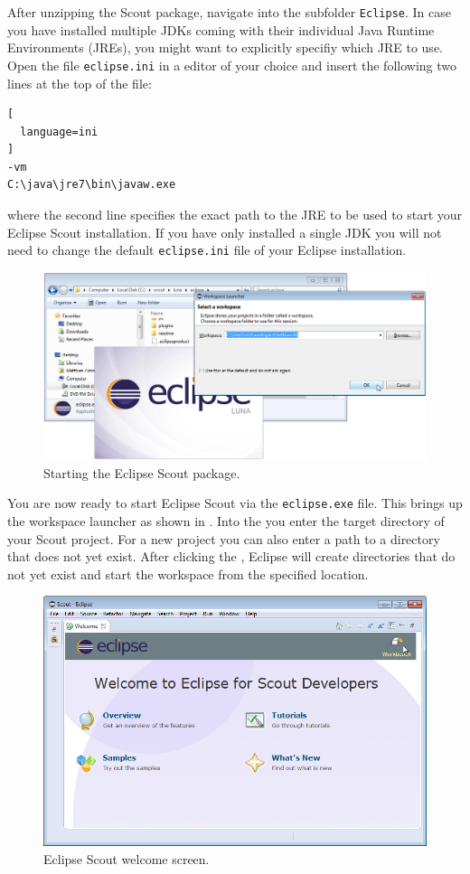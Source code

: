 \documentclass[a4paper,10pt,twoside]{book}
\begin{document}
After unzipping the Scout package, navigate into the subfolder \texttt{Eclipse}.
In case you have installed multiple JDKs coming with their individual Java Runtime Environments (JREs), you might want to explicitly specifiy which JRE to use.
Open the file \texttt{eclipse.ini} in a editor of your choice and insert the following two lines at the top of the file:

\begin{lstlisting}[
  language=ini
]
-vm
C:\java\jre7\bin\javaw.exe
\end{lstlisting}

where the second line specifies the exact path to the JRE to be used to start your Eclipse Scout installation.
If you have only installed a single JDK you will not need to change the default \texttt{eclipse.ini} file of your Eclipse installation.

\begin{figure}
\includegraphics[width=15cm]{scout_startup_select_workspace.png}
\caption{Starting the Eclipse Scout package.}
\end{figure}

You are now ready to start Eclipse Scout via the \texttt{eclipse.exe} file. 
This brings up the workspace launcher as shown in .
Into the  you enter the target directory of your Scout project.
For a new project you can also enter a path to a directory that does not yet exist.
After clicking the , Eclipse will create directories that do not yet exist and start the workspace from the specified location.

\begin{figure}
\includegraphics[width=13cm]{scout_startup_welcome.png}
\caption{Eclipse Scout welcome screen.}
\end{figure}
\end{document}
